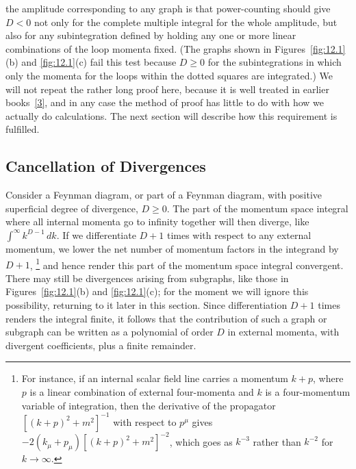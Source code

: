
the amplitude corresponding to any graph is that power-counting should
give $D<0$ not only for the complete multiple integral for the whole
amplitude, but also for any subintegration defined by holding any one
or more linear combinations of the loop momenta fixed. (The graphs
shown in Figures~\ref{fig:12.1}(b) and
\ref{fig:12.1}(c) fail this test because $D\geq0$ for the
subintegrations in which only the momenta for the loops within the dotted
squares are integrated.) We will not repeat the rather long proof here,
because it is well treated in earlier books~\hyperref[ref:12.3]{[3]}, and
in any case the method of proof has little to do with how we actually do
calculations. The next section will describe how this requirement is
fulfilled.

\subsection{Cancellation of Divergences}\label{sec:12.2}

Consider a Feynman diagram, or part of a Feynman diagram, with positive
superficial degree of divergence, $D\geq0$. The part of the momentum space
integral where all internal momenta go to infinity together will then
diverge, like $\int^\infty k^{D-1}\,dk$. If we differentiate $D+1$ times
with respect to any external momentum, we lower the net number of momentum
factors in the integrand by $D+1$,
\footnote{For instance, if an internal scalar field line carries a momentum
$k+p$, where $p$ is a linear combination of external four-momenta and $k$ is
a four-momentum variable of integration, then the derivative of the
propagator $[(k+p)^2+m^2]^{-1}$ with respect to $p^\mu$ gives
$-2(k_\mu+p_\mu)[(k+p)^2+m^2]^{-2}$, which goes as $k^{-3}$ rather than
$k^{-2}$ for $k\to\infty$.}
and hence render this part of the momentum space integral convergent. There
may still be divergences arising from subgraphs, like those in
Figures~\ref{fig:12.1}(b) and \ref{fig:12.1}(c); for the
moment we will ignore this possibility, returning to it later in this
section. Since differentiation $D+1$ times renders the integral finite, it
follows that the contribution of such a graph or subgraph can be written as
a polynomial of order $D$ in external momenta, with divergent coefficients,
plus a finite remainder.

